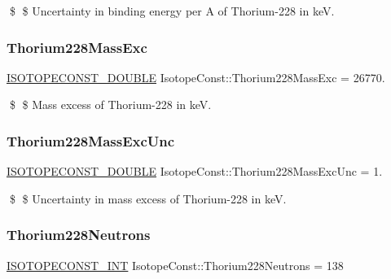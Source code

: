 \$ \$ Uncertainty in binding energy per A of Thorium-\/228 in keV. \mbox{\label{group___isotope_const-_thorium-_th228_ga167d4304c692ec62c3d48c9f01bb041c}} 
\subsubsection{\texorpdfstring{Thorium228\+Mass\+Exc}{Thorium228MassExc}}
{\footnotesize\ttfamily \mbox{\hyperlink{group___isotope_const-_macros_ga8f45a7272ce02c0b4c65c44636ed719a}{I\+S\+O\+T\+O\+P\+E\+C\+O\+N\+S\+T\+\_\+\+D\+O\+U\+B\+LE}} Isotope\+Const\+::\+Thorium228\+Mass\+Exc = 26770.}

\$ \$ Mass excess of Thorium-\/228 in keV. \mbox{\label{group___isotope_const-_thorium-_th228_gaf706d7c9ec24674c2da8f2bb891316bf}} 
\subsubsection{\texorpdfstring{Thorium228\+Mass\+Exc\+Unc}{Thorium228MassExcUnc}}
{\footnotesize\ttfamily \mbox{\hyperlink{group___isotope_const-_macros_ga8f45a7272ce02c0b4c65c44636ed719a}{I\+S\+O\+T\+O\+P\+E\+C\+O\+N\+S\+T\+\_\+\+D\+O\+U\+B\+LE}} Isotope\+Const\+::\+Thorium228\+Mass\+Exc\+Unc = 1.}

\$ \$ Uncertainty in mass excess of Thorium-\/228 in keV. \mbox{\label{group___isotope_const-_thorium-_th228_ga88ce0f2361fb824573d88c04ad982a90}} 
\subsubsection{\texorpdfstring{Thorium228\+Neutrons}{Thorium228Neutrons}}
{\footnotesize\ttfamily \mbox{\hyperlink{group___isotope_const-_macros_ga5f18360b3e99483a35c32d789e62621c}{I\+S\+O\+T\+O\+P\+E\+C\+O\+N\+S\+T\+\_\+\+I\+NT}} Isotope\+Const\+::\+Thorium228\+Neutrons = 138}

